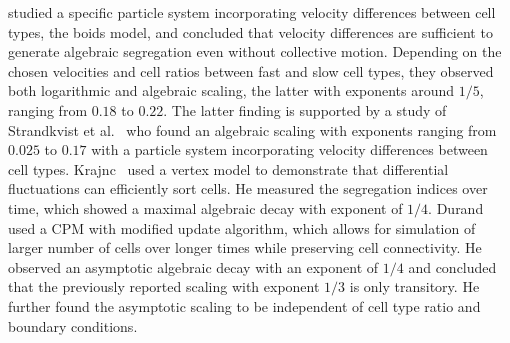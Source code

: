 \documentclass[10pt,letterpaper]{article}
\begin{document}
studied a specific particle system incorporating velocity differences
between cell types, the boids model, and concluded that velocity
differences are sufficient to generate algebraic segregation even
without collective motion. Depending on the chosen velocities and cell
ratios between fast and slow cell types, they observed both logarithmic
and algebraic scaling, the latter with exponents around $1/5$, ranging from $0.18$
to $0.22$. The latter finding is supported by a study of Strandkvist
et al.~\cite{StrJuuBauKabDuk2014} who found an algebraic scaling with
exponents ranging from $0.025$ to $0.17$ with a particle system
incorporating velocity differences between cell types.
Krajnc~\cite{Kra2020} used a vertex model to demonstrate that
differential fluctuations can efficiently sort cells.
He measured the segregation indices over
time, which showed a maximal algebraic decay with exponent of $1/4$.
Durand~\cite{Dur2021} used a CPM with modified update algorithm, which
allows for simulation of larger number of cells over longer times
while preserving cell connectivity. He observed an asymptotic
algebraic decay with an exponent of $1/4$ and concluded that the
previously reported scaling with exponent $1/3$ is only transitory. He
further found the asymptotic scaling to be independent of cell type
ratio and boundary conditions.
\end{document}
